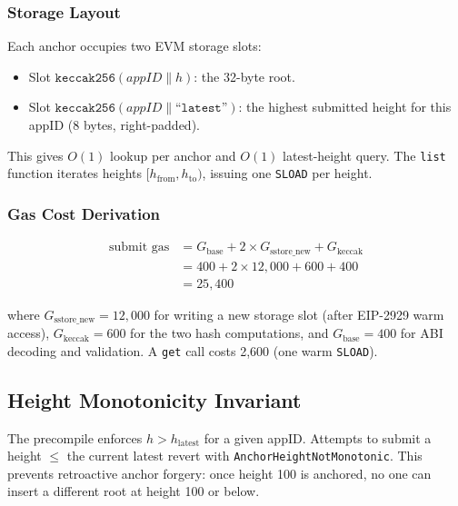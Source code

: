 \subsubsection{Storage Layout}

Each anchor occupies two EVM storage slots:

\begin{itemize}[nosep]
  \item Slot $\texttt{keccak256}(\mathit{appID} \| h)$: the 32-byte root.
  \item Slot $\texttt{keccak256}(\mathit{appID} \| \texttt{``latest''})$:
        the highest submitted height for this appID (8 bytes, right-padded).
\end{itemize}

\noindent
This gives $O(1)$ lookup per anchor and $O(1)$ latest-height query. The
\texttt{list} function iterates heights $[h_{\text{from}}, h_{\text{to}})$,
issuing one \texttt{SLOAD} per height.

\subsubsection{Gas Cost Derivation}

\begin{align*}
\text{submit gas} &= G_{\text{base}} + 2 \times G_{\text{sstore\_new}} + G_{\text{keccak}} \\
                  &= 400 + 2 \times 12{,}000 + 600 + 400 \\
                  &= 25{,}400
\end{align*}

\noindent
where $G_{\text{sstore\_new}} = 12{,}000$ for writing a new storage slot
(after EIP-2929 warm access), $G_{\text{keccak}} = 600$ for the two hash
computations, and $G_{\text{base}} = 400$ for ABI decoding and validation.
A \texttt{get} call costs 2,600 (one warm \texttt{SLOAD}).

\subsection{Height Monotonicity Invariant}

The precompile enforces $h > h_{\text{latest}}$ for a given appID. Attempts
to submit a height $\leq$ the current latest revert with
\texttt{AnchorHeightNotMonotonic}. This prevents retroactive anchor
forgery: once height 100 is anchored, no one can insert a different root
at height 100 or below.

